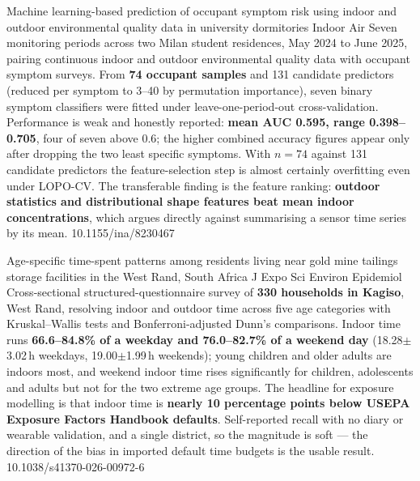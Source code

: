 \documentclass[10pt]{article}
\begin{document}
{Machine learning-based prediction of occupant symptom risk using indoor and outdoor
environmental quality data in university dormitories}
{Indoor Air}
{Seven monitoring periods across two Milan student residences, May 2024 to June 2025,
pairing continuous indoor and outdoor environmental quality data with occupant symptom
surveys. From \textbf{74 occupant samples} and 131 candidate predictors (reduced per
symptom to 3--40 by permutation importance), seven binary symptom classifiers were fitted
under leave-one-period-out cross-validation. Performance is weak and honestly reported:
\textbf{mean AUC 0.595, range 0.398--0.705}, four of seven above 0.6; the higher combined
accuracy figures appear only after dropping the two least specific symptoms. With $n=74$
against 131 candidate predictors the feature-selection step is almost certainly
overfitting even under LOPO-CV. The transferable finding is the feature ranking:
\textbf{outdoor statistics and distributional shape features beat mean indoor
concentrations}, which argues directly against summarising a sensor time series by its
mean.}
{10.1155/ina/8230467}


{Age-specific time-spent patterns among residents living near gold mine tailings storage
facilities in the West Rand, South Africa}
{J Expo Sci Environ Epidemiol}
{Cross-sectional structured-questionnaire survey of \textbf{330 households in Kagiso},
West Rand, resolving indoor and outdoor time across five age categories with
Kruskal--Wallis tests and Bonferroni-adjusted Dunn's comparisons. Indoor time runs
\textbf{66.6--84.8\% of a weekday and 76.0--82.7\% of a weekend day}
(18.28$\pm$3.02\,h weekdays, 19.00$\pm$1.99\,h weekends); young children and older adults
are indoors most, and weekend indoor time rises significantly for children, adolescents
and adults but not for the two extreme age groups. The headline for exposure modelling is
that indoor time is \textbf{nearly 10 percentage points below USEPA Exposure Factors
Handbook defaults}. Self-reported recall with no diary or wearable validation, and a
single district, so the magnitude is soft --- the direction of the bias in imported
default time budgets is the usable result.}
{10.1038/s41370-026-00972-6}

\end{document}
